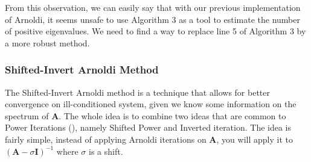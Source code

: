 \documentclass[11pt]{article}
\numberwithin{equation}{section}
\begin{document}
From this observation, we can easily say that with our previous implementation of Arnoldi, it seems unsafe to use Algorithm 3 as a tool to estimate the number of positive eigenvalues. We need to find a way to replace line 5 of Algorithm 3 by a more robust method.

\subsubsection{Shifted-Invert Arnoldi Method}
The Shifted-Invert Arnoldi method is a technique that allows for better convergence on ill-conditioned system, given we know some information on the spectrum of $\mathbf{A}$. The whole idea is to combine two ideas that are common to Power Iterations (\cite{saad2011numerical}), namely Shifted Power and Inverted iteration. The idea is fairly simple, instead of applying Arnoldi iterations on $\mathbf{A}$, you will apply it to $(\mathbf{A}-\sigma\mathbf{I})^{-1}$ where $\sigma$ is a shift.
\end{document}
